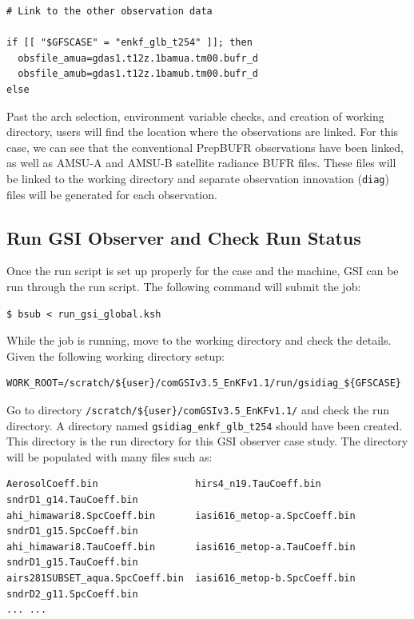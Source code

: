 \begin{itemize}
\begin{footnotesize}
\begin{verbatim}
# Link to the other observation data

if [[ "$GFSCASE" = "enkf_glb_t254" ]]; then
  obsfile_amua=gdas1.t12z.1bamua.tm00.bufr_d
  obsfile_amub=gdas1.t12z.1bamub.tm00.bufr_d
else
\end{verbatim}
\end{footnotesize}
Past the arch selection, environment variable checks, and creation of working directory, users will find the location where the observations are linked. For this case, we can see that the conventional PrepBUFR observations have been linked, as well as AMSU-A and AMSU-B satellite radiance BUFR files. These files will be linked to the working directory and separate observation innovation (\verb|diag|) files will be generated for each observation.
\end{itemize}

%
\subsection{Run GSI Observer and Check Run Status}

Once the run script is set up properly for the case and the machine, GSI can be run through the run script. The following command will submit the job:

\begin{footnotesize}
\begin{verbatim}
$ bsub < run_gsi_global.ksh
\end{verbatim}
\end{footnotesize}

While the job is running, move to the working directory and check the details. Given the following working directory setup:
\begin{footnotesize}
\begin{verbatim}
WORK_ROOT=/scratch/${user}/comGSIv3.5_EnKFv1.1/run/gsidiag_${GFSCASE}
\end{verbatim}
\end{footnotesize}
Go to directory \verb|/scratch/${user}/comGSIv3.5_EnKFv1.1/| and check the run directory. A directory named \verb|gsidiag_enkf_glb_t254| should have been created. This directory is the run directory for this GSI observer case study. The directory will be populated with many files such as:

\begin{footnotesize}
\begin{verbatim}
AerosolCoeff.bin                 hirs4_n19.TauCoeff.bin         sndrD1_g14.TauCoeff.bin
ahi_himawari8.SpcCoeff.bin       iasi616_metop-a.SpcCoeff.bin   sndrD1_g15.SpcCoeff.bin
ahi_himawari8.TauCoeff.bin       iasi616_metop-a.TauCoeff.bin   sndrD1_g15.TauCoeff.bin
airs281SUBSET_aqua.SpcCoeff.bin  iasi616_metop-b.SpcCoeff.bin   sndrD2_g11.SpcCoeff.bin
... ...
\end{verbatim}
\end{footnotesize}

